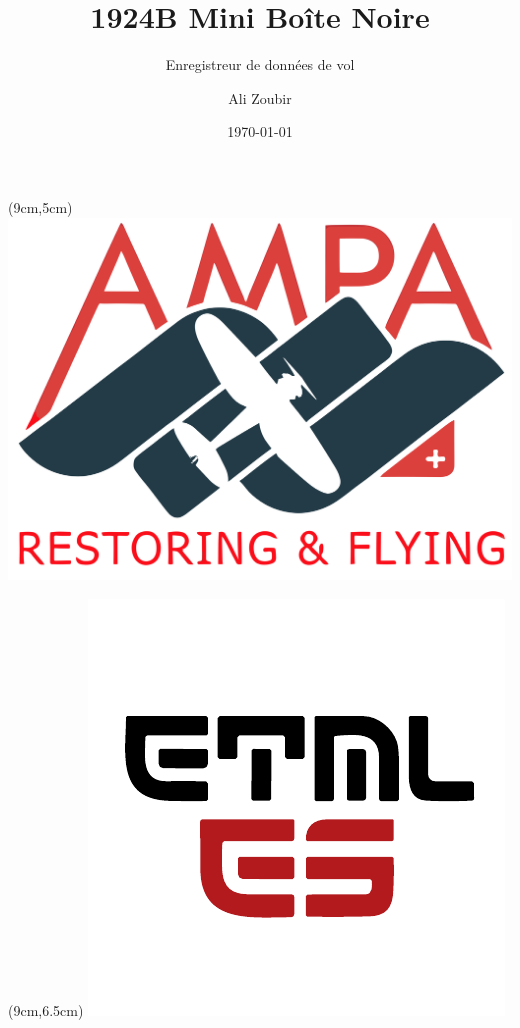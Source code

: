 \documentclass{beamer}
\title{1924B Mini Boîte Noire}
\subtitle{Enregistreur de données de vol}
\author{Ali Zoubir}
\institute{ETML-\textcolor{red}{ES}}
\date{\today}
\begin{document}
	
\begin{frame}[plain]
	\maketitle
	\begin{textblock*}{2cm}(9cm,5cm) %
		\includegraphics[width=1\linewidth]{../figures/AMPA}
	\end{textblock*}
	\begin{textblock*}{2cm}(9cm,6.5cm) %
		\includegraphics[width=1\linewidth]{../figures/ETML-ES}
	\end{textblock*}
\end{frame}
\end{document}
